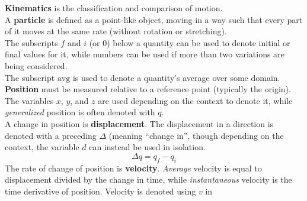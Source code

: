 \documentclass[../AP_Physics_C/mech]{subfiles}
\begin{document}
		\textbf{Kinematics} is the classification and comparison of motion. \\
	A \textbf{particle} is defined as a point-like object, moving in a way such that every part of it moves at the same rate (without rotation or stretching). \\
	The subscripts $f$ and $i$ (or $0$) below a quantity can be used to denote initial or final values for it, while numbers can be used if more than two variations are being considered. \\
	The subscript $\mathrm{avg}$ is used to denote a quantity's average over some domain. \\
	\textbf{Position} must be measured relative to a reference point (typically the origin). The variables $x$, $y$, and $z$ are used depending on the context to denote it, while \emph{generalized} position is often denoted with $q$. \\
	A change in position is \textbf{displacement}. The displacement in a direction is denoted with a preceding $\Delta$ (meaning \enquote{change in}, though depending on the context, the variable $d$ can instead be used in isolation. \\
	\[\Delta q  = q_f - q_i\]
	The rate of change of position is \textbf{velocity}. \emph{Average} velocity is equal to displacement divided by the change in time, while \emph{instantaneous} velocity is the time derivative of position. Velocity is denoted using $v$ in 
\end{document}
